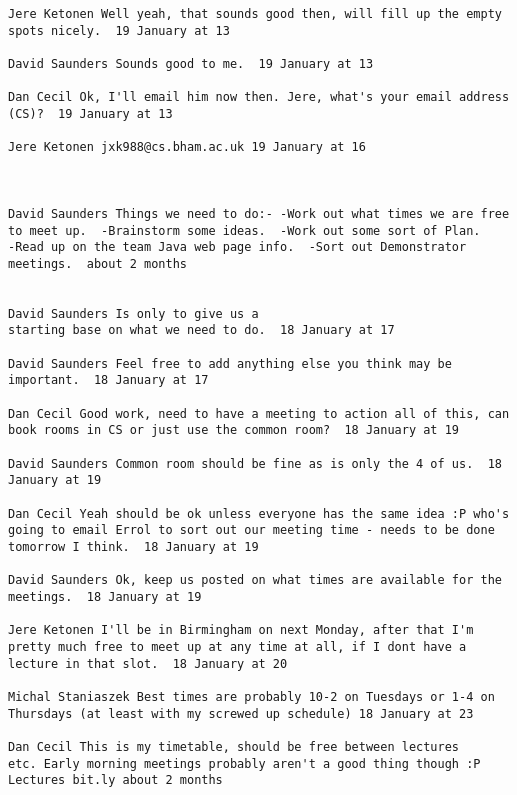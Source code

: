 \begin{verbatim}
Jere Ketonen Well yeah, that sounds good then, will fill up the empty
spots nicely.  19 January at 13

David Saunders Sounds good to me.  19 January at 13

Dan Cecil Ok, I'll email him now then. Jere, what's your email address
(CS)?  19 January at 13

Jere Ketonen jxk988@cs.bham.ac.uk 19 January at 16



David Saunders Things we need to do:- -Work out what times we are free
to meet up.  -Brainstorm some ideas.  -Work out some sort of Plan.
-Read up on the team Java web page info.  -Sort out Demonstrator
meetings.  about 2 months 
 

David Saunders Is only to give us a
starting base on what we need to do.  18 January at 17

David Saunders Feel free to add anything else you think may be
important.  18 January at 17

Dan Cecil Good work, need to have a meeting to action all of this, can
book rooms in CS or just use the common room?  18 January at 19

David Saunders Common room should be fine as is only the 4 of us.  18
January at 19

Dan Cecil Yeah should be ok unless everyone has the same idea :P who's
going to email Errol to sort out our meeting time - needs to be done
tomorrow I think.  18 January at 19

David Saunders Ok, keep us posted on what times are available for the
meetings.  18 January at 19

Jere Ketonen I'll be in Birmingham on next Monday, after that I'm
pretty much free to meet up at any time at all, if I dont have a
lecture in that slot.  18 January at 20

Michal Staniaszek Best times are probably 10-2 on Tuesdays or 1-4 on
Thursdays (at least with my screwed up schedule) 18 January at 23

Dan Cecil This is my timetable, should be free between lectures
etc. Early morning meetings probably aren't a good thing though :P
Lectures bit.ly about 2 months 

\end{verbatim}